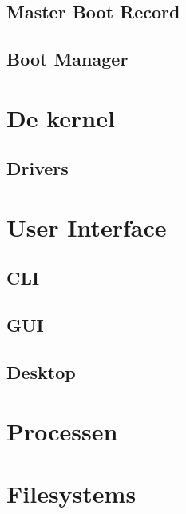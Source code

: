 \documentclass[a4paper,12pt,twoside,openright,titlepage]{book}
\begin{document}
\section{Master Boot Record}

\section{Boot Manager}


\chapter{De kernel}

\section{Drivers}


\chapter{User Interface}

\section{CLI}

\section{GUI}

\section{Desktop}


\chapter{Processen}


\chapter{Filesystems}


\backmatter
\printindex
\end{document}
